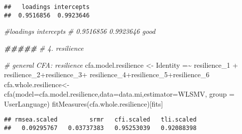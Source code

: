 \documentclass[
]{article}
\newenvironment{Shaded}{\begin{snugshade}}{\end{snugshade}}
\newcommand{\AttributeTok}[1]{\textcolor[rgb]{0.77,0.63,0.00}{#1}}
\newcommand{\CommentTok}[1]{\textcolor[rgb]{0.56,0.35,0.01}{\textit{#1}}}
\newcommand{\DocumentationTok}[1]{\textcolor[rgb]{0.56,0.35,0.01}{\textbf{\textit{#1}}}}
\newcommand{\FunctionTok}[1]{\textcolor[rgb]{0.00,0.00,0.00}{#1}}
\newcommand{\NormalTok}[1]{#1}
\newcommand{\OtherTok}[1]{\textcolor[rgb]{0.56,0.35,0.01}{#1}}
\newcommand{\SpecialCharTok}[1]{\textcolor[rgb]{0.00,0.00,0.00}{#1}}
\newcommand{\StringTok}[1]{\textcolor[rgb]{0.31,0.60,0.02}{#1}}
\begin{document}
\begin{verbatim}
##   loadings intercepts 
##  0.9516856  0.9923646
\end{verbatim}

\begin{Shaded}
\begin{Highlighting}[]
\CommentTok{\#loadings intercepts }
\CommentTok{\# 0.9516856  0.9923646     good}


\DocumentationTok{\#\#\#\#\#}
\CommentTok{\# 4. resilience}


\CommentTok{\# general CFA: resilience}
\NormalTok{cfa.model.resilience }\OtherTok{\textless{}{-}} \StringTok{\textquotesingle{}Identity =\textasciitilde{} resilience\_1 + resilience\_2+resilience\_3+}
\StringTok{  resilience\_4+resilience\_5+resilience\_6\textquotesingle{}}
\NormalTok{cfa.whole.resilience}\OtherTok{\textless{}{-}} \FunctionTok{cfa}\NormalTok{(}\AttributeTok{model=}\NormalTok{cfa.model.resilience,}\AttributeTok{data=}\NormalTok{data.mi,}\AttributeTok{estimator=}\StringTok{\textquotesingle{}WLSMV\textquotesingle{}}\NormalTok{, }\AttributeTok{group =} 
                           \StringTok{\textquotesingle{}UserLanguage\textquotesingle{}}\NormalTok{)}
\FunctionTok{fitMeasures}\NormalTok{(cfa.whole.resilience)[fits]}
\end{Highlighting}
\end{Shaded}

\begin{verbatim}
## rmsea.scaled         srmr   cfi.scaled   tli.scaled 
##   0.09295767   0.03737383   0.95253039   0.92088398
\end{verbatim}

\begin{Shaded}
\end{Shaded}
\end{document}
